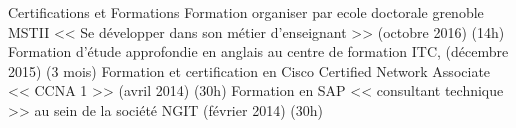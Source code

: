 \begin{rubric}{Certifications et Formations}
\entry*[]	 Formation organiser par ecole doctorale grenoble MSTII << Se développer dans son métier d'enseignant >> (octobre 2016) (14h)	
\entry*[]	 Formation d'étude approfondie en anglais au centre de formation ITC, (décembre 2015) (3 mois) 
\entry*[]	 Formation et certification en Cisco Certified Network Associate << CCNA 1 >> (avril 2014) (30h)
\entry*[]	 Formation en SAP << consultant technique >> au sein de la société NGIT (février 2014) (30h)
\end{rubric}
